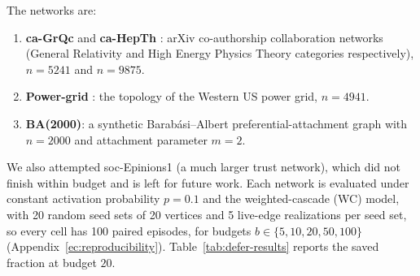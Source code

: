 \documentclass[11pt]{article}
\theoremstyle{definition}
\theoremstyle{remark}
\begin{document}
\noindent The networks are:

\begin{enumerate}
\item \textbf{ca-GrQc} and \textbf{ca-HepTh} \citep{leskovec2007}: arXiv
  co-authorship collaboration networks (General Relativity and High Energy
  Physics Theory categories respectively), $n=5241$ and $n=9875$.
\item \textbf{Power-grid} \citep{watts1998}: the topology of the Western
  US power grid, $n=4941$.
\item \textbf{BA(2000)}: a synthetic Barab\'asi--Albert preferential-attachment
  graph \citep{barabasi1999} with $n=2000$ and attachment parameter $m=2$.
\end{enumerate}

\noindent We also attempted soc-Epinions1 (a much larger trust network), which did not finish within budget and is left for future work. Each network is evaluated under constant activation probability $p=0.1$ and the weighted-cascade (WC) model, with 20 random seed sets of 20 vertices and 5 live-edge realizations per seed set, so every cell has 100 paired episodes, for budgets $b\in\{5,10,20,50,100\}$ (Appendix~\ref{ec:reproducibility}). Table~\ref{tab:defer-results} reports the saved fraction at budget $20$.
\end{document}
